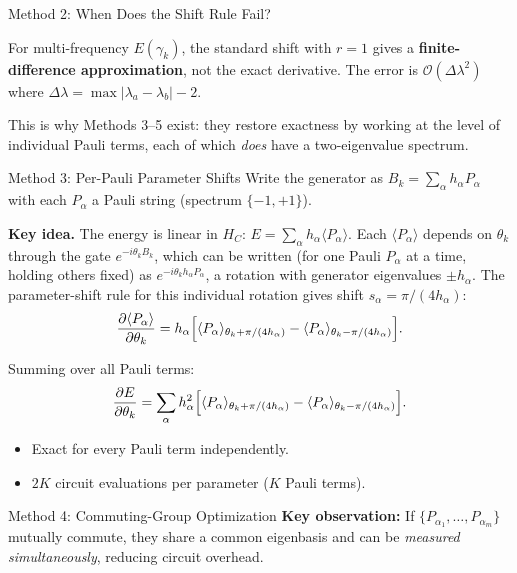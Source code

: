 \documentclass{beamer}
\begin{document}
\begin{frame}
\begin{frame}{Method 2: When Does the Shift Rule Fail?}
\medskip

For multi-frequency $E(\gamma_k)$, the standard shift with $r=1$
gives a \textbf{finite-difference approximation}, not the exact
derivative.  The error is $\mathcal{O}(\Delta\lambda^2)$ where
$\Delta\lambda = \max|\lambda_a - \lambda_b| - 2$.

\medskip

This is why Methods 3--5 exist: they restore exactness by working
at the level of individual Pauli terms, each of which \emph{does}
have a two-eigenvalue spectrum.
\end{frame}


\begin{frame}{Method 3: Per-Pauli Parameter Shifts}
Write the generator as $B_k = \sum_\alpha h_\alpha P_\alpha$
with each $P_\alpha$ a Pauli string (spectrum $\{-1,+1\}$).

\medskip
\textbf{Key idea.}  The energy is linear in $H_C$:
$E = \sum_\alpha h_\alpha\langle P_\alpha\rangle$.
Each $\langle P_\alpha\rangle$ depends on $\theta_k$ through the
gate $e^{-i\theta_k B_k}$, which can be written (for one Pauli
$P_\alpha$ at a time, holding others fixed) as
$e^{-i\theta_k h_\alpha P_\alpha}$, a rotation with generator
eigenvalues $\pm h_\alpha$.  The parameter-shift rule for this
individual rotation gives shift $s_\alpha = \pi/(4h_\alpha)$:
\[
\frac{\partial\langle P_\alpha\rangle}{\partial\theta_k}
= h_\alpha\Bigl[\langle P_\alpha\rangle_{\theta_k+\pi/(4h_\alpha)}
              - \langle P_\alpha\rangle_{\theta_k-\pi/(4h_\alpha)}\Bigr].
\]

Summing over all Pauli terms:
\[
\frac{\partial E}{\partial\theta_k}
= \sum_\alpha h_\alpha^2
\Bigl[\langle P_\alpha\rangle_{\theta_k+\pi/(4h_\alpha)}
    - \langle P_\alpha\rangle_{\theta_k-\pi/(4h_\alpha)}\Bigr].
\]

\begin{itemize}
\item[\textbf{+}] Exact for every Pauli term independently.
\item[\textbf{--}] $2K$ circuit evaluations per parameter ($K$ Pauli terms).
\end{itemize}
\end{frame}


\begin{frame}{Method 4: Commuting-Group Optimization}
\textbf{Key observation:} If $\{P_{\alpha_1},\dots,P_{\alpha_m}\}$
mutually commute, they share a common eigenbasis and can be
\emph{measured simultaneously}, reducing circuit overhead.


\end{frame}
\end{frame}
\end{document}

